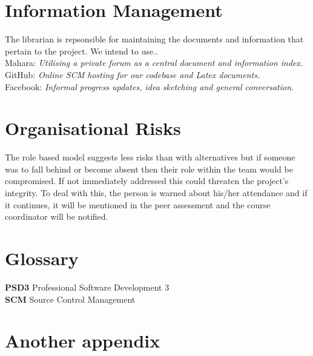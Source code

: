 \documentclass{l3deliverable}
\begin{document}
{\section{Information Management}

The librarian is repsonsible for maintaining the documents and information that pertain to the project.
We intend to use..\\

Mahara: \textit{Utilising a private forum as a central document and information index.}\\
GitHub: \textit{Online SCM hosting for our codebase and Latex documents.}\\
Facebook: \textit{Informal progress updates, idea sketching and general conversation.}\\



\section{Organisational Risks}

The role based model suggests less risks than with alternatives but if someone was to fall behind or
become absent then their role within the team would be compromised. If not immediately addressed
this could threaten the project’s integrity. To deal with this, the person is warned about his/her attendance and if it continues, it will be mentioned in the peer assessment and the course coordinator will be notified.


\appendix

\section{Glossary}

\textbf{PSD3} Professional Software Development 3\\
\textbf{SCM} Source Control Management\\

\section{Another appendix}

}
\end{document}
